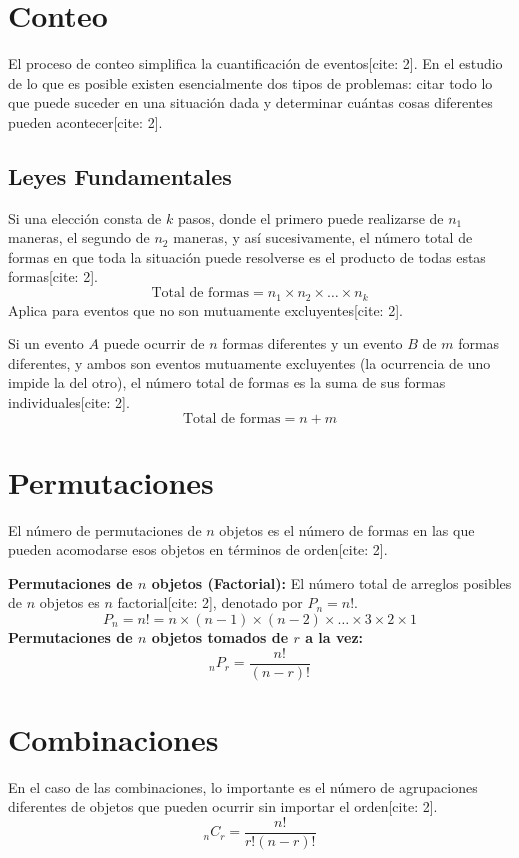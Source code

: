 \documentclass[12pt,a4paper]{book}
\begin{document}
\section{Conteo}
El proceso de conteo simplifica la cuantificación de eventos[cite: 2]. En el estudio de lo que es posible existen esencialmente dos tipos de problemas: citar todo lo que puede suceder en una situación dada y determinar cuántas cosas diferentes pueden acontecer[cite: 2]. 

\subsection{Leyes Fundamentales}
\begin{definicion}
Si una elección consta de $k$ pasos, donde el primero puede realizarse de $n_{1}$ maneras, el segundo de $n_{2}$ maneras, y así sucesivamente, el número total de formas en que toda la situación puede resolverse es el producto de todas estas formas[cite: 2].
\[
\text{Total de formas} = n_{1} \times n_{2} \times \dots \times n_{k}
\]
Aplica para eventos que no son mutuamente excluyentes[cite: 2].
\end{definicion}

\begin{definicion}
Si un evento $A$ puede ocurrir de $n$ formas diferentes y un evento $B$ de $m$ formas diferentes, y ambos son eventos mutuamente excluyentes (la ocurrencia de uno impide la del otro), el número total de formas es la suma de sus formas individuales[cite: 2].
\[
\text{Total de formas} = n + m
\]
\end{definicion}

\section{Permutaciones}
El número de permutaciones de $n$ objetos es el número de formas en las que pueden acomodarse esos objetos en términos de orden[cite: 2].

\textbf{Permutaciones de $n$ objetos (Factorial):} El número total de arreglos posibles de $n$ objetos es $n$ factorial[cite: 2], denotado por $P_{n} = n!$.
\[
P_{n} = n! = n \times (n-1) \times (n-2) \times \dots \times 3 \times 2 \times 1
\]
\textbf{Permutaciones de $n$ objetos tomados de $r$ a la vez:}
\[
_{n}P_{r} = \frac{n!}{(n-r)!}
\]

\section{Combinaciones}
En el caso de las combinaciones, lo importante es el número de agrupaciones diferentes de objetos que pueden ocurrir sin importar el orden[cite: 2].
\[
_{n}C_{r} = \frac{n!}{r! (n-r)!}
\]
\end{document}
